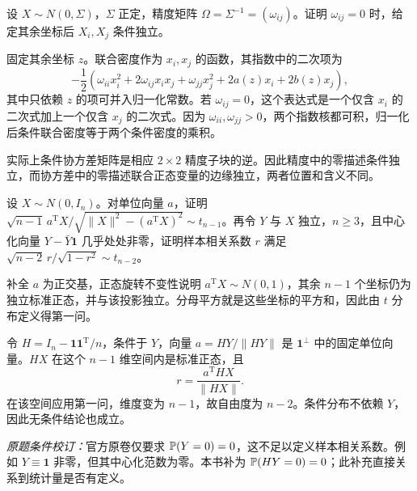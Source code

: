 \begin{example}[原题4：精度矩阵与条件独立]\label{yau:2018-4}
设 $X\sim N(0,\Sigma)$，$\Sigma$ 正定，精度矩阵 $\Omega=\Sigma^{-1}=(\omega_{ij})$。证明 $\omega_{ij}=0$ 时，给定其余坐标后 $X_i,X_j$ 条件独立。
\end{example}
\begin{solve}
固定其余坐标 $z$。联合密度作为 $x_i,x_j$ 的函数，其指数中的二次项为
\[
-\frac12\left(\omega_{ii}x_i^2+2\omega_{ij}x_ix_j+\omega_{jj}x_j^2+2a(z)x_i+2b(z)x_j\right),
\]
其中只依赖 $z$ 的项可并入归一化常数。若 $\omega_{ij}=0$，这个表达式是一个仅含 $x_i$ 的二次式加上一个仅含 $x_j$ 的二次式。因为 $\omega_{ii},\omega_{jj}>0$，两个指数核都可积，归一化后条件联合密度等于两个条件密度的乘积。

实际上条件协方差矩阵是相应 $2\times2$ 精度子块的逆。因此精度中的零描述条件独立，而协方差中的零描述联合正态变量的边缘独立，两者位置和含义不同。
\end{solve}

\begin{example}[原题5：正态向量的投影与样本相关系数]\label{yau:2018-5}
设 $X\sim N(0,I_n)$。对单位向量 $a$，证明 $\sqrt{n-1}\,a^{\mathrm T}X/\sqrt{\|X\|^2-(a^{\mathrm T}X)^2}\sim t_{n-1}$。再令 $Y$ 与 $X$ 独立，$n\ge3$，且中心化向量 $Y-\bar Y\mathbf1$ 几乎处处非零，证明样本相关系数 $r$ 满足 $\sqrt{n-2}\,r/\sqrt{1-r^2}\sim t_{n-2}$。
\end{example}
\begin{solve}
补全 $a$ 为正交基，正态旋转不变性说明 $a^{\mathrm T}X\sim N(0,1)$，其余 $n-1$ 个坐标仍为独立标准正态，并与该投影独立。分母平方就是这些坐标的平方和，因此由 $t$ 分布定义得第一问。

令 $H=I_n-\mathbf1\mathbf1^{\mathrm T}/n$，条件于 $Y$，向量 $a=HY/\|HY\|$ 是 $\mathbf1^\perp$ 中的固定单位向量。$HX$ 在这个 $n-1$ 维空间内是标准正态，且
\[
r=\frac{a^{\mathrm T}HX}{\|HX\|}.
\]
在该空间应用第一问，维度变为 $n-1$，故自由度为 $n-2$。条件分布不依赖 $Y$，因此无条件结论也成立。

\emph{原题条件校订：}官方原卷仅要求 $\mathbb P(Y=0)=0$，这不足以定义样本相关系数。例如 $Y\equiv\mathbf1$ 非零，但其中心化范数为零。本书补为 $\mathbb P(HY=0)=0$；此补充直接关系到统计量是否有定义。
\end{solve}


